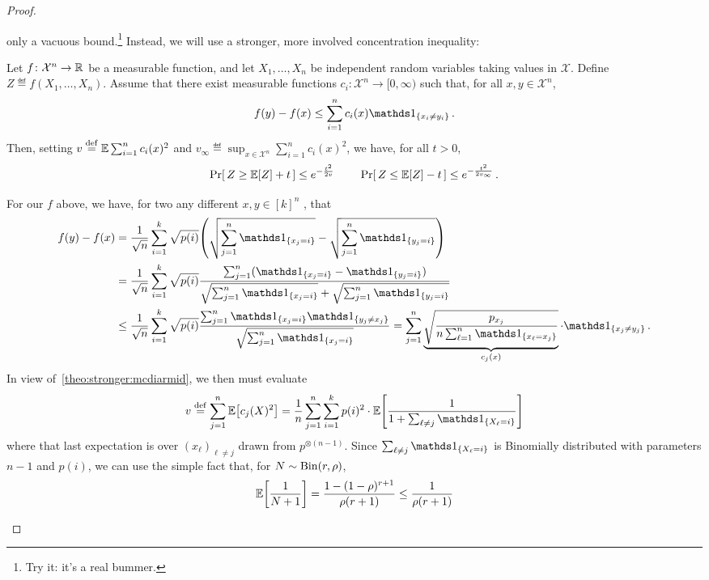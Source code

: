\documentclass[10pt]{article}
\newcommand{\ab}{k}
\newcommand{\ns}{n}
\begin{document}
\begin{proof}
\begin{itemize}
only a vacuous bound.\footnote{Try it: it's a real bummer.}{} Instead, we will use a stronger, more involved concentration inequality:
      \begin{theorem}\label{theo:stronger:mcdiarmid}
          Let $f\colon \mathcal{X}^\ns \to \R$ be a measurable function, and let $X_1,\dots,X_\ns$ be independent random variables taking values in $\mathcal{X}$. Define $Z\eqdef f(X_1,\dots,X_\ns)$. Assume that there exist measurable functions $c_i\colon \mathcal{X}^\ns \to [0,\infty)$ such that, for all $x,y\in\mathcal{X}^\ns$,
          \[
              f(y) - f(x) \leq \sum_{i=1}^\ns c_i(x) \indic{x_i \neq y_i}\,.
          \]
          Then, setting $v \eqdef \shortexpect \sum_{i=1}^\ns c_i(x)^2$ and $v_\infty \eqdef \sup_{x\in\mathcal{X}^\ns} \sum_{i=1}^\ns c_i(x)^2$, we have, for all $t>0$,
          \[
              \Pr\!\left[\,  Z \geq \mathbb{E}\!\left[Z\right] + t \, \right] \leq e^{-\frac{t^2}{2v}}\,\qquad \Pr\!\left[\,  Z \leq \mathbb{E}\!\left[Z\right] - t \, \right] \leq e^{-\frac{t^2}{2v_\infty}}\,.
          \]
      \end{theorem}
      For our $f$ above, we have, for two any different $x, y \in [\ab]^\ns$ , that
      \begin{align*}
        f(y)-f(x) 
        &= \frac{1}{\sqrt{\ns}} \sum_{i=1}^\ab \sqrt{p(i)} \mleft( \sqrt{\sum_{j=1}^\ns \indic{x_j=i}} - \sqrt{\sum_{j=1}^\ns \indic{y_j=i}} \mright) \\
        &= \frac{1}{\sqrt{\ns}} \sum_{i=1}^\ab \sqrt{p(i)} \frac{\sum_{j=1}^\ns (\indic{x_j=i}-\indic{y_j=i})}{ \sqrt{\sum_{j=1}^\ns \indic{x_j=i}} + \sqrt{\sum_{j=1}^\ns \indic{y_j=i}} } \\
        &\leq \frac{1}{\sqrt{\ns}} \sum_{i=1}^\ab \sqrt{p(i)} \frac{\sum_{j=1}^\ns \indic{x_j=i}\indic{y_j\neq x_j}}{ \sqrt{\sum_{j=1}^\ns \indic{x_j=i}} }
        = \sum_{j=1}^\ns \underbrace{\sqrt{ \frac{ p_{x_j} }{ \ns\sum_{\ell=1}^\ns \indic{x_\ell=x_j} } }}_{c_j(x)} \cdot \indic{x_j\neq y_j}\,.
      \end{align*}
      In view of~\autoref{theo:stronger:mcdiarmid}, we then must evaluate
      \[
          v \eqdef \sum_{j=1}^\ns \expect{c_j(X)^2} = \frac{1}{\ns} \sum_{j=1}^\ns  \sum_{i=1}^\ab p(i)^2 \cdot \expect{ \frac{1}{1+ \sum_{\ell\neq j} \indic{X_\ell=i} } }
      \]
      where that last expectation is over $(x_\ell)_{\ell\neq j}$ drawn from $p^{\otimes(\ns-1)}$. Since $\sum_{\ell\neq j} \indic{X_\ell=i}$ is Binomially distributed with parameters $\ns-1$ and $p(i)$, we can use the simple fact that, for $N\sim\operatorname{Bin}\!\left( r, \rho \right)$,
      \[
          \mathbb{E}\!\left[\frac{1}{N+1}\right] = \frac{1-(1-\rho)^{r+1}}{\rho(r+1)} \leq \frac{1}{\rho(r+1)}
\]
\end{itemize}
\end{proof}
\end{document}
